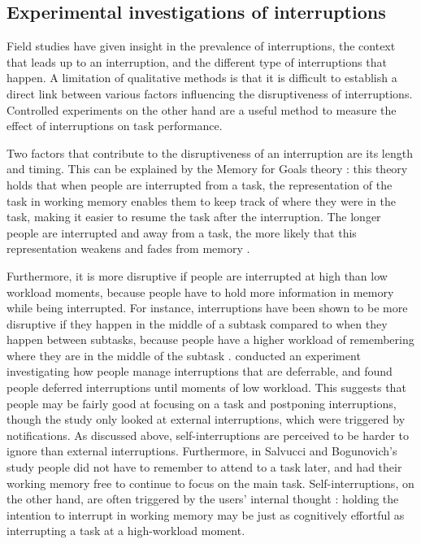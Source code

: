 \subsection{Experimental investigations of interruptions}
Field studies have given insight in the prevalence of interruptions, the context that leads up to an interruption, and the different type of interruptions that happen. A limitation of qualitative methods is that it is difficult to establish a direct link between various factors influencing the disruptiveness of interruptions. Controlled experiments on the other hand are a useful method to measure the effect of interruptions on task performance.

Two factors that contribute to the disruptiveness of an interruption are its length and timing. This can be explained by the Memory for Goals theory \citep{Altmann2002}: this theory holds that when people are interrupted from a task, the representation of the task in working memory enables them to keep track of where they were in the task, making it easier to resume the task after the interruption. The longer people are interrupted and away from a task, the more likely that this representation weakens and fades from memory \citep{Altmann2017, Monk2008}. 

Furthermore, it is more disruptive if people are interrupted at high than low workload moments, because people have to hold more information in memory while being interrupted. For instance, interruptions have been shown to be more disruptive if they happen in the middle of a subtask compared to when they happen between subtasks, because people have a higher workload of remembering where they are in the middle of the subtask \citep{Gould2013a, Iqbal2005}. \citet{Salvucci2010} conducted an experiment investigating how people manage interruptions that are deferrable, and found people deferred interruptions until moments of low workload. This suggests that people may be fairly good at focusing on a task and postponing interruptions, though the study only looked at external interruptions, which were triggered by notifications. As discussed above, self-interruptions are perceived to be harder to ignore than external interruptions. Furthermore, in Salvucci and Bogunovich's study people did not have to remember to attend to a task later, and had their working memory free to continue to focus on the main task. Self-interruptions, on the other hand, are often triggered by the users' internal thought \citep{Jin2009}: holding the intention to interrupt in working memory may be just as cognitively effortful as interrupting a task at a high-workload moment.

